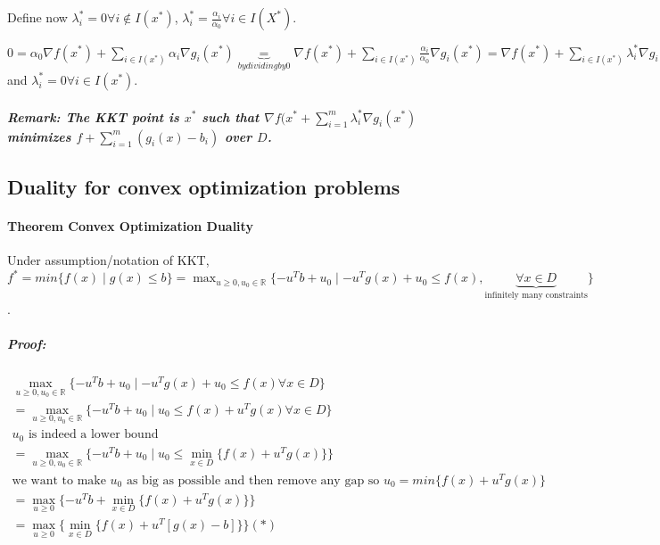 \documentclass[main]{subfiles}
\begin{document}
Define now $\lambda_{i}^{*} = 0 \forall i \notin I(x^{*})$, $\lambda_{i}^{*} = \frac{\alpha_{i}}{\alpha_{0}} \forall i \in I(X^{*})$.

$0 = \alpha_{0} \nabla f(x^{*}) + \sum_{i \in I(x^{*})} \alpha_{i} \nabla g_{i}(x^{*}) \underbrace{=}_{by dividing by 0} \nabla f(x^{*}) + \sum_{i \in I(x^{*})} \frac{\alpha_{i}}{\alpha_{0}}\nabla g_{i}(x^{*}) = \nabla f(x^{*}) + \sum_{i \in I(x^{*})} \lambda_{i}^{*} \nabla g_{i}(x^{*})$ and $ \lambda_{i}^{*} = 0 \forall i \in I(x^{*})$.

\subparagraph{Remark: The KKT point is $x^{*}$ such that $\nabla f(x^{*} + \sum_{i=1}^{m} \lambda_{i}^{*} \nabla g_{i}(x^{*})$ minimizes $f + \sum_{i =1 }^{m} (g_{i}(x) - b_{i})$ over $D$.}


\subsection{Duality for convex optimization problems}

\paragraph{Theorem Convex Optimization Duality}
Under assumption/notation of KKT, $f^{*} = min \{ f(x) \mid g(x) \leq b \} = \displaystyle \max_{u \geq 0, u_{0} \in \mathbb{R}} \{-u^{T}b + u_{0} \mid -u^{T}g(x) + u_{0} \leq f(x), \underbrace{\forall x \in D}_{\text{infinitely many constraints}} \}$.

\subparagraph{Proof:}

\begin{gather*}
\max_{u \geq 0, u_{0} \in \mathbb{R}} \{-u^{T}b + u_{0} \mid -u^{T}g(x) + u_{0} \leq f(x) \forall x \in D \} \\
= \max_{u \geq 0, u_{0} \in \mathbb{R}} \{-u^{T}b + u_{0} \mid u_{0} \leq f(x) + u^{T}g(x) \forall x \in D \} \\
\text{$u_{0}$ is indeed a lower bound} \\
= \max_{u \geq 0, u_{0} \in \mathbb{R}} \{-u^{T}b + u_{0} \mid u_{0} \leq \min_{x \in D} \{f(x) + u^{T}g(x)\} \} \\
\text{we want to make $u_{0}$ as big as possible and then remove any gap so $u_{0} = min \{f(x) + u^{T}g(x)\}$ } \\
= \max_{u \geq 0} \{-u^{T}b + \min_{x \in D} \{f(x) + u^{T}g(x)\} \} \\
= \max_{u \geq 0} \{ \min_{x \in D} \{f(x) + u^{T}[g(x) -b] \} \} (*)\\
\end{gather*}
\end{document}

